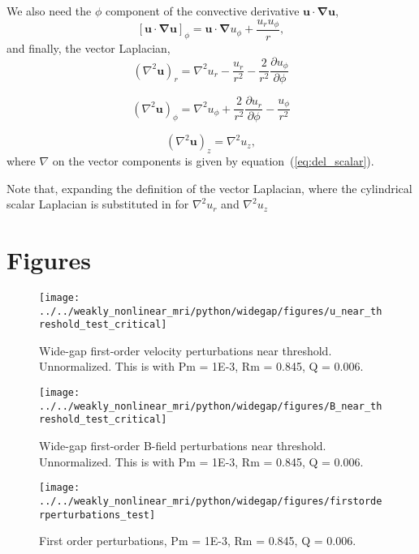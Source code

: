 \documentclass{paper}
\newcommand{\uphi}{\ensuremath{u_\phi}}
\begin{document}
We also need the $\phi$ component of the convective derivative $\mathbf{u \cdot \nabla u}$,
\begin{equation}
  \label{eq:convective_deriv_phi}
  \left[\mathbf{u \cdot \nabla u} \right]_\phi = \mathbf{u \cdot \nabla} \uphi + \frac{ u_r \uphi}{r},
\end{equation}
and finally, the vector Laplacian,
\begin{equation}
  \label{eq:vec_lap_r}
  (\nabla^2 \mathbf{u})_r = \nabla^2 u_r - \frac{u_r}{r^2} - \frac{2}{r^2} \frac{\partial \uphi}{\partial \phi}
\end{equation}

\begin{equation}
  \label{eq:vec_lap_phi}
  (\nabla^2 \mathbf{u})_\phi = \nabla^2 u_\phi + \frac{2}{r^2} \frac{\partial u_r}{\partial \phi} - \frac{u_\phi}{r^2} 
\end{equation}

\begin{equation}
  \label{eq:vec_lap_z}
  (\nabla^2 \mathbf{u})_z = \nabla^2 u_z,
\end{equation}
where $\nabla$ on the vector components is given by equation~(\ref{eq:del_scalar}).

Note that, expanding the definition of the vector Laplacian, where the cylindrical scalar Laplacian is substituted in for $\nabla^2 u_r$ and $\nabla^2 u_z$  


\section{Figures}

\begin{figure}[h!]
\centering
\texttt{[image: ../../weakly\_nonlinear\_mri/python/widegap/figures/u\_near\_threshold\_test\_critical]}
\caption{Wide-gap first-order velocity perturbations near threshold. Unnormalized. This is with Pm = 1E-3, Rm = 0.845, Q = 0.006.
\label{fig:firstorder_u}}
\end{figure}

\begin{figure}[h!]
\centering
\texttt{[image: ../../weakly\_nonlinear\_mri/python/widegap/figures/B\_near\_threshold\_test\_critical]}
\caption{Wide-gap first-order B-field perturbations near threshold. Unnormalized. This is with Pm = 1E-3, Rm = 0.845, Q = 0.006.
\label{fig:firstorder_B}}
\end{figure}

\begin{figure}[h!]
\centering
\texttt{[image: ../../weakly\_nonlinear\_mri/python/widegap/figures/firstorderperturbations\_test]}
\caption{First order perturbations, Pm = 1E-3, Rm = 0.845, Q = 0.006.
\label{fig:firstorder_all}}
\end{figure}
\end{document}
